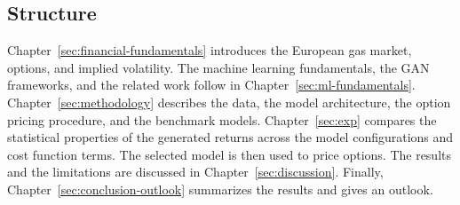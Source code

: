 \subsection{Structure}\label{sec:structure}
Chapter~\ref{sec:financial-fundamentals} introduces the European gas market, options, and implied volatility. The machine learning fundamentals, the GAN frameworks, and the related work follow in Chapter~\ref{sec:ml-fundamentals}. Chapter~\ref{sec:methodology} describes the data, the model architecture, the option pricing procedure, and the benchmark models. Chapter~\ref{sec:exp} compares the statistical properties of the generated returns across the model configurations and cost function terms. The selected model is then used to price options. The results and the limitations are discussed in Chapter~\ref{sec:discussion}. Finally, Chapter~\ref{sec:conclusion-outlook} summarizes the results and gives an outlook.